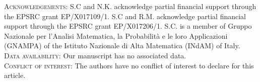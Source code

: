 \documentclass[a4paper,11pt]{article}
\numberwithin{equation}{section}
\theoremstyle{definition}
\begin{document}
\noindent \textsc{Acknowledgements:} S.C and N.K. acknowledge partial financial support through the EPSRC grant EP/X017109/1. S.C and R.M. acknowledge partial financial support through the EPSRC grant EP/X017206/1. S.C. is a member of Gruppo Nazionale per
l’Analisi Matematica, la Probabilità e le loro Applicazioni (GNAMPA) of the Istituto Nazionale
di Alta Matematica (INdAM) of Italy.\\

\noindent \textsc{Data availability}: Our manuscript has no associated data.\\

\noindent \textsc{Conflict of interest}: The authors have no conflict of interest to declare for this article.





\end{document}
